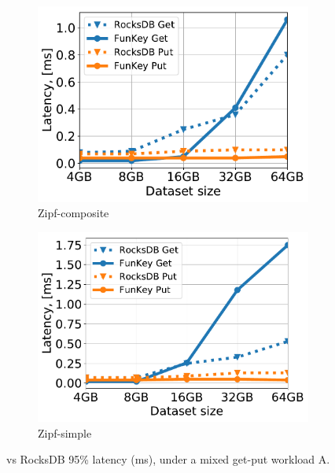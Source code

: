 {\begin{figure}[htb]
\centering
\begin{subfigure}{0.49\linewidth}
\includegraphics[width=\textwidth]{figs/tail_flurry_line.pdf}
\caption{Zipf-composite}
\label{fig:tail_latency:co}
\end{subfigure}
\begin{subfigure}{0.49\linewidth}
\includegraphics[width=\textwidth]{figs/tail_zipf_line.pdf}
\caption{Zipf-simple}
\label{fig:tail_latency:si}
\end{subfigure}
\caption{{\sys\/ vs RocksDB 95\% latency (ms), under a mixed get-put workload A.}}
\label{fig:tail_latency}
\end{figure}

}
